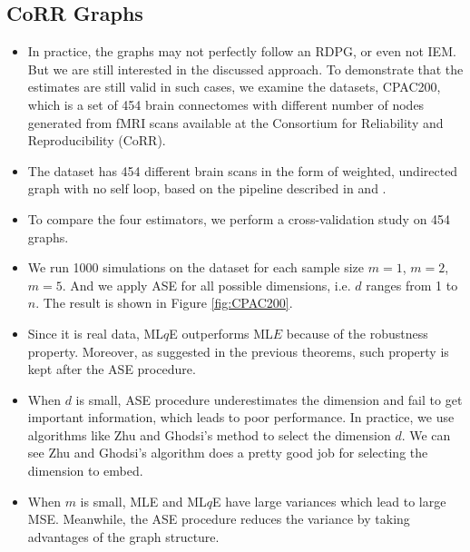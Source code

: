 \documentclass[a4paper]{article}
\begin{document}
\subsection{CoRR Graphs}
\begin{itemize}
\item In practice, the graphs may not perfectly follow an RDPG, or even not IEM. But we are still interested in the discussed approach. To demonstrate that the estimates are still valid in such cases, we examine the datasets, CPAC200, which is a set of 454 brain connectomes with different number of nodes generated from fMRI scans available at the Consortium for Reliability and Reproducibility (CoRR).
\item The dataset has 454 different brain scans in the form of weighted, undirected graph with no self loop, based on the pipeline described in \cite{kiar2016graph} and \cite{neurodata}.
\item To compare the four estimators, we perform a cross-validation study on 454 graphs.
\item We run 1000 simulations on the dataset for each sample size $m = 1$, $m = 2$, $m = 5$. And we apply ASE for all possible dimensions, i.e. $d$ ranges from 1 to $n$. The result is shown in Figure \ref{fig:CPAC200}.
\item Since it is real data, ML$q$E outperforms ML$E$ because of the robustness property. Moreover, as suggested in the previous theorems, such property is kept after the ASE procedure.
\item When $d$ is small, ASE procedure underestimates the dimension and fail to get important information, which leads to poor performance. In practice, we use algorithms like Zhu and Ghodsi's method to select the dimension $d$. We can see Zhu and Ghodsi's algorithm does a pretty good job for selecting the dimension to embed.
\item When $m$ is small, MLE and ML$q$E have large variances which lead to large MSE. Meanwhile, the ASE procedure reduces the variance by taking advantages of the graph structure.
\end{itemize}
\end{document}
